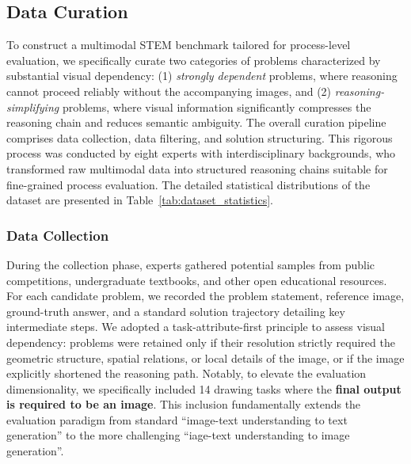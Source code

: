 \documentclass[11pt]{article}
\begin{document}
\subsection{Data Curation}
\label{sec:data_curation}

To construct a multimodal STEM benchmark tailored for process-level evaluation, we specifically curate two categories of problems characterized by substantial visual dependency: (1) \textit{strongly dependent} problems, where reasoning cannot proceed reliably without the accompanying images, and (2) \textit{reasoning-simplifying} problems, where visual information significantly compresses the reasoning chain and reduces semantic ambiguity. The overall curation pipeline comprises data collection, data filtering, and solution structuring. This rigorous process was conducted by eight experts with interdisciplinary backgrounds, who transformed raw multimodal data into structured reasoning chains suitable for fine-grained process evaluation. The detailed statistical distributions of the dataset are presented in Table~\ref{tab:dataset_statistics}.


\subsubsection{\textbf{Data Collection}}
During the collection phase, experts gathered potential samples from public competitions, undergraduate textbooks, and other open educational resources. For each candidate problem, we recorded the problem statement, reference image, ground-truth answer, and a standard solution trajectory detailing key intermediate steps. We adopted a task-attribute-first principle to assess visual dependency: problems were retained only if their resolution strictly required the geometric structure, spatial relations, or local details of the image, or if the image explicitly shortened the reasoning path. Notably, to elevate the evaluation dimensionality, we specifically included 14 drawing tasks where the \textbf{final output is required to be an image}. This inclusion fundamentally extends the evaluation paradigm from standard ``image-text understanding to text generation'' to the more challenging ``iage-text understanding to image generation''.
\end{document}

